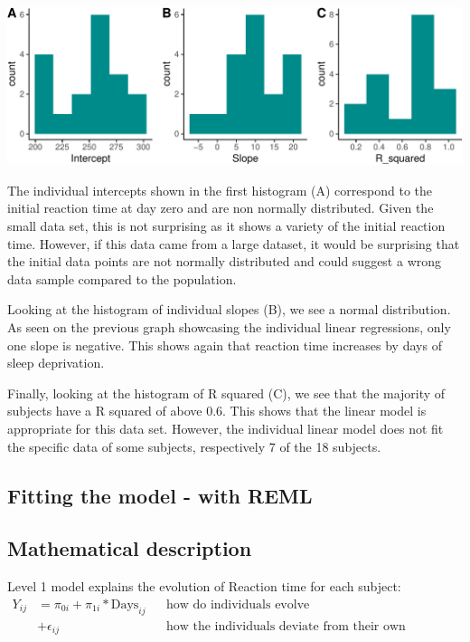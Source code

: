 \documentclass[
]{article}
\begin{document}
\begin{center}\includegraphics{common_sleep_files/figure-latex/unnamed-chunk-3-1} \end{center}

The individual intercepts shown in the first histogram (A) correspond to
the initial reaction time at day zero and are non normally distributed.
Given the small data set, this is not surprising as it shows a variety
of the initial reaction time. However, if this data came from a large
dataset, it would be surprising that the initial data points are not
normally distributed and could suggest a wrong data sample compared to
the population.

Looking at the histogram of individual slopes (B), we see a normal
distribution. As seen on the previous graph showcasing the individual
linear regressions, only one slope is negative. This shows again that
reaction time increases by days of sleep deprivation.

Finally, looking at the histogram of R squared (C), we see that the
majority of subjects have a R squared of above 0.6. This shows that the
linear model is appropriate for this data set. However, the individual
linear model does not fit the specific data of some subjects,
respectively 7 of the 18 subjects.

\hypertarget{fitting-the-model---with-reml}{%
\subsection{Fitting the model - with
REML}\label{fitting-the-model---with-reml}}

\hypertarget{mathematical-description}{%
\subsection{Mathematical description}\label{mathematical-description}}

Level 1 model explains the evolution of Reaction time for each subject:
\[\begin{aligned}
Y_{ij}&= \pi_{0i} + \pi_{1i}* \text{Days}_{ij} && \text{how do individuals evolve} \\
          &+ \epsilon_{ij} &&\text{how the individuals deviate from their own evolution}
\end{aligned}\]
\end{document}
